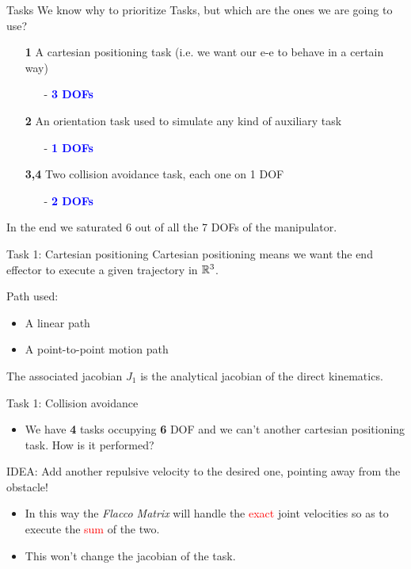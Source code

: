\documentclass[11pt]{beamer}
\newcommand{\dof}[1]{\begin{itemize}
\item[-]\textcolor{blue}{\textbf{#1 DOFs}}
\end{itemize}}
\begin{document}
\begin{frame}{Tasks}
We know why to prioritize Tasks, but which are the ones we are going to use?
\begin{itemize}
\item[\textbf{1}] A cartesian positioning task (i.e. we want our e-e to behave in a certain way)
\dof{3}
\item[\textbf{2}] An orientation task used to simulate any kind of auxiliary task
\dof{1}
\item[\textbf{3,4}] Two collision avoidance task, each one on 1 DOF
\dof{2}
\end{itemize}
In the end we saturated 6 out of all the 7 DOFs of the manipulator.
\end{frame}

\begin{frame}{Task 1: Cartesian positioning}
Cartesian positioning means we want the end effector to execute a given trajectory  in $\Bbb R^3$.

\begin{block}{Path used:}
\begin{itemize}
\item A linear path
\item A point-to-point motion path
\end{itemize}
\end{block}

The associated jacobian $J_1$ is the analytical jacobian of the direct kinematics.
\end{frame}

\begin{frame}{Task 1: Collision avoidance}
\begin{itemize}
\item We have \textbf{4} tasks occupying \textbf{6} DOF and we can't another cartesian positioning task. How is it performed?
\end{itemize}
\begin{block}{IDEA:}
Add another repulsive velocity to the desired one, pointing away from the obstacle! 
\end{block}
\begin{itemize}
\item In this way the \emph{Flacco Matrix} will handle the \textcolor{red}{exact} joint velocities so as to execute the \textcolor{red}{sum} of the two.
\item This won't change the jacobian of the task.
\end{itemize}
\end{frame}
\end{document}

